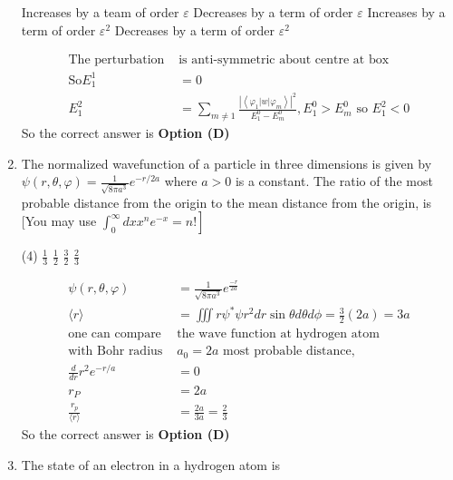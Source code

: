 \begin{enumerate}
\begin{tasks}
\task[\textbf{A.}] Increases by a team of order $\varepsilon$
\task[\textbf{B.}] Decreases by a term of order $\varepsilon$
\task[\textbf{C.}] Increases by a term of order $\varepsilon^{2}$
\task[\textbf{D.}] Decreases by a term of order $\varepsilon^{2}$
\end{tasks}
\begin{answer}
	$$
\begin{aligned}
\text{The perturbation }&\text{is anti-symmetric about centre at box}\\
\mathrm{So} E_{1}^{1}&=0\\
E_{1}^{2}&=\sum_{m \neq 1} \frac{\left|\left\langle\varphi_{1}|w| \varphi_{m}\right\rangle\right|^{2}}{E_{1}^{0}-E_{m}^{0}}, E_{1}^{0}>E_{m}^{0}\text{ so } E_{1}^{2}<0
\end{aligned}
$$
So the correct answer is \textbf{Option (D)}
\end{answer}
\item The normalized wavefunction of a particle in three dimensions is given by $\psi(r, \theta, \varphi)=\frac{1}{\sqrt{8 \pi a^{3}}} e^{-r / 2 a}$ where $a>0$ is a constant. The ratio of the most probable distance from the origin to the mean distance from the origin, is
[You may use $\left.\int_{0}^{\infty} d x x^{n} e^{-x}=n !\right]$
{}
\begin{tasks}(4)
\task[\textbf{A.}] $\frac{1}{3}$
\task[\textbf{B.}] $\frac{1}{2}$
\task[\textbf{C.}] $\frac{3}{2}$
\task[\textbf{D.}] $\frac{2}{3}$
\end{tasks}
\begin{answer}
	$$
\begin{aligned}
\psi(r, \theta, \varphi)&=\frac{1}{\sqrt{8 \pi a^{3}}} e^{\frac{-r}{2 a}}\\
\langle r\rangle&=\iiint r \psi^{*} \psi r^{2} d r \sin \theta d \theta d \phi=\frac{3}{2}(2 a)=3 a\\
\text{one can compare  }&\text{the  wave function at hydrogen atom}\\
\text{with Bohr radius }&\text{$a_{0}=2 a$ most probable distance,}\\
\frac{d}{d r} r^{2} e^{-r / a}&=0\\
r_{P}&=2 a\\
\frac{r_{p}}{\langle r\rangle}&=\frac{2 a}{3 a}=\frac{2}{3}
\end{aligned}
$$
So the correct answer is \textbf{Option (D)}
\end{answer}
	\item The state of an electron in a hydrogen atom is

\end{enumerate}
